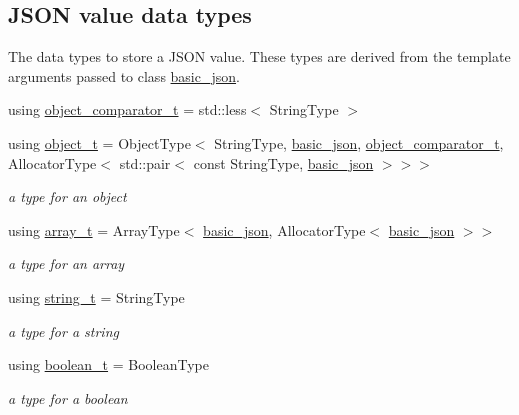 \subsection*{J\+S\+ON value data types}
\label{_amgrpbddfba6d49869d59bfd397e65b8cba87}%
The data types to store a J\+S\+ON value. These types are derived from the template arguments passed to class \hyperlink{classnlohmann_1_1basic__json}{basic\+\_\+json}. \begin{DoxyCompactItemize}
\item 
using \hyperlink{classnlohmann_1_1basic__json_ac26c2e8d6bcaccde372ceedd81851200}{object\+\_\+comparator\+\_\+t} = std\+::less$<$ String\+Type $>$
\item 
using \hyperlink{classnlohmann_1_1basic__json_a5e3df077f880583a96d74cd63e173cb2}{object\+\_\+t} = Object\+Type$<$ String\+Type, \hyperlink{classnlohmann_1_1basic__json}{basic\+\_\+json}, \hyperlink{classnlohmann_1_1basic__json_ac26c2e8d6bcaccde372ceedd81851200}{object\+\_\+comparator\+\_\+t}, Allocator\+Type$<$ std\+::pair$<$ const String\+Type, \hyperlink{classnlohmann_1_1basic__json}{basic\+\_\+json} $>$$>$$>$
\begin{DoxyCompactList}\small\item\em a type for an object \end{DoxyCompactList}\item 
using \hyperlink{classnlohmann_1_1basic__json_a53700c308d804f84aea5ff05abb2ac4e}{array\+\_\+t} = Array\+Type$<$ \hyperlink{classnlohmann_1_1basic__json}{basic\+\_\+json}, Allocator\+Type$<$ \hyperlink{classnlohmann_1_1basic__json}{basic\+\_\+json} $>$$>$
\begin{DoxyCompactList}\small\item\em a type for an array \end{DoxyCompactList}\item 
using \hyperlink{classnlohmann_1_1basic__json_a33593865ffb1860323dcbd52425b90c8}{string\+\_\+t} = String\+Type
\begin{DoxyCompactList}\small\item\em a type for a string \end{DoxyCompactList}\item 
using \hyperlink{classnlohmann_1_1basic__json_a44fd1a12c9c54623c942b430e7a72937}{boolean\+\_\+t} = Boolean\+Type
\begin{DoxyCompactList}\small\item\em a type for a boolean \end{DoxyCompactList}\item 
$$
\end{DoxyCompactItemize}
